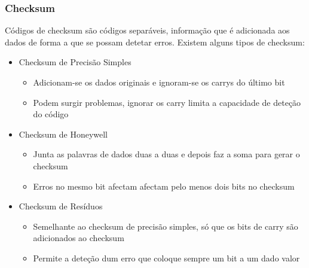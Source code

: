\documentclass[10pt,a4paper]{report}
\begin{document}
\subsubsection{Checksum}
Códigos de checksum são códigos separáveis, informação que é adicionada aos dados de forma a que se possam detetar erros. Existem alguns tipos de checksum:
\begin{itemize}
\item Checksum de Precisão Simples
\begin{itemize}
\item Adicionam-se os dados originais e ignoram-se os carrys do último bit
\item Podem surgir problemas, ignorar os carry limita a capacidade de deteção do código
\end{itemize}
\item Checksum de Honeywell
\begin{itemize}
\item Junta as palavras de dados duas a duas e depois faz a soma para gerar o checksum
\item Erros no mesmo bit afectam afectam pelo menos dois bits no checksum
\end{itemize}
\item Checksum de Resíduos
\begin{itemize}
\item Semelhante ao checksum de precisão simples, só que os bits de carry são adicionados ao checksum
\item Permite a deteção dum
erro que coloque sempre um bit a um dado valor
\end{itemize}
\end{itemize}
\end{document}
